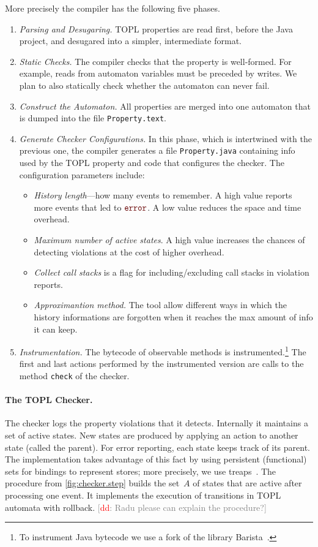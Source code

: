 \documentclass[9pt, preprint]{sigplanconf} %
\newcommand{\noterg}[2]{\textcolor{gray}{[\textcolor{red}{#1}: #2]}}
\newcommand{\dd}[1]{\noterg{dd}{#1}}
\newcommand{\error}{\ensuremath{\textcolor{darkred}{\mathtt{error}}}\xspace}
\theoremstyle{definition}
\theoremstyle{remark}
\begin{document}
More precisely the compiler has the following five phases.
\begin{enumerate}
\item {\em Parsing and Desugaring.}
TOPL properties are read first, before the Java project, and desugared into a simpler, intermediate format. 
\item {\em Static Checks.} The compiler checks that the property is well-formed. For example, reads from automaton variables must be preceded by writes. We plan to also statically check whether the automaton can never fail.
%
\item {\em Construct the Automaton.} All properties are merged into one automaton that is  dumped into the file {\tt Property.text}.
%
\item {\em Generate Checker Configurations.}
In this phase, which is intertwined with the previous one, the compiler generates a file {\tt Property.java} containing 
info used by the TOPL property and code that configures the checker.
The configuration parameters include:
\begin{itemize}
\item \emph{History length}---how many events to remember.
  A high value reports more events that led to \error.
  A low value reduces the space and time overhead.
\item \emph{Maximum number of active states}.
  A high value increases the chances of detecting violations at the cost of higher  overhead.

\item \emph{Collect call stacks} is a flag for including/excluding  call stacks in violation reports.
%
\item {\em Approximantion method.} The tool allow different ways in which the history informations are forgotten when it reaches the max amount of info it can keep.
\end{itemize}
%
\item {\em Instrumentation.}
The bytecode of observable methods is instrumented.\footnote{To instrument Java bytecode we use a fork of the library 
Barista~\cite{barista}.}
The first and last actions performed by the instrumented version are calls to the method {\tt check} of the checker.
\end{enumerate}

\paragraph{The TOPL Checker.} %
The checker logs the property violations that it detects. 
Internally it  maintains a set of active states.
New states are  produced by applying an action to another state (called the parent).
For error reporting, each state keeps track of its parent.
The implementation takes advantage of this fact by using persistent (functional) sets for bindings to represent stores; more precisely, we use treaps~\cite{DBLP:conf/focs/AragonS89}.
%
The procedure from \autoref{fig:checker.step} builds the set~$A$ of states that are active after processing one event.
It implements the execution of  transitions in  TOPL automata with rollback.
\dd{Radu please can explain the procedure?}
\end{document}
